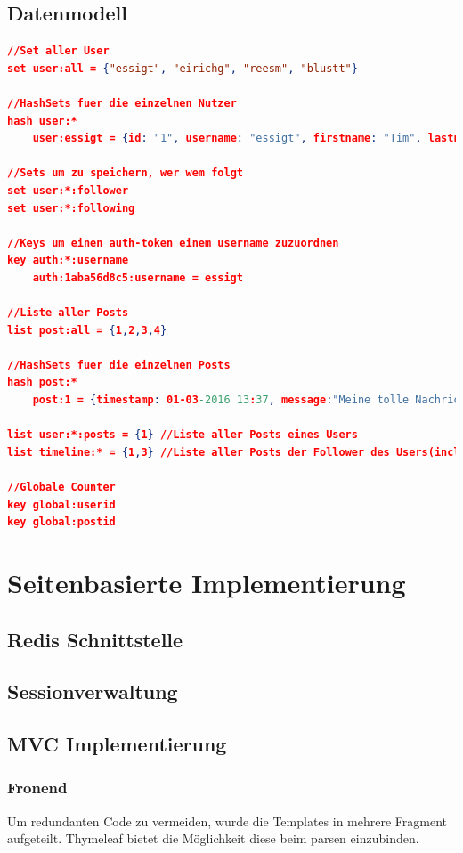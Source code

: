 \documentclass[
    a4paper
]{scrreprt}
\begin{document}
    \section{Datenmodell}
        \begin{lstlisting}[language=json]
//Set aller User
set user:all = {"essigt", "eirichg", "reesm", "blustt"}

//HashSets fuer die einzelnen Nutzer
hash user:*
    user:essigt = {id: "1", username: "essigt", firstname: "Tim", lastname: "Essig", password: "xyz", auth: "1aba56d8c5"}

//Sets um zu speichern, wer wem folgt
set user:*:follower
set user:*:following

//Keys um einen auth-token einem username zuzuordnen
key auth:*:username
    auth:1aba56d8c5:username = essigt

//Liste aller Posts
list post:all = {1,2,3,4}

//HashSets fuer die einzelnen Posts
hash post:*
    post:1 = {timestamp: 01-03-2016 13:37, message:"Meine tolle Nachricht", user:"essigt"}

list user:*:posts = {1} //Liste aller Posts eines Users
list timeline:* = {1,3} //Liste aller Posts der Follower des Users(incl. seiner eigenen)

//Globale Counter
key global:userid
key global:postid
        \end{lstlisting}


    \chapter{Seitenbasierte Implementierung}
    \section{Redis Schnittstelle}

    \section{Sessionverwaltung}

    \section{MVC Implementierung}
    \subsection{Fronend}
	Um redundanten Code zu vermeiden, wurde die Templates in mehrere Fragment aufgeteilt. Thymeleaf bietet die Möglichkeit diese beim parsen einzubinden.
	
\end{document}
